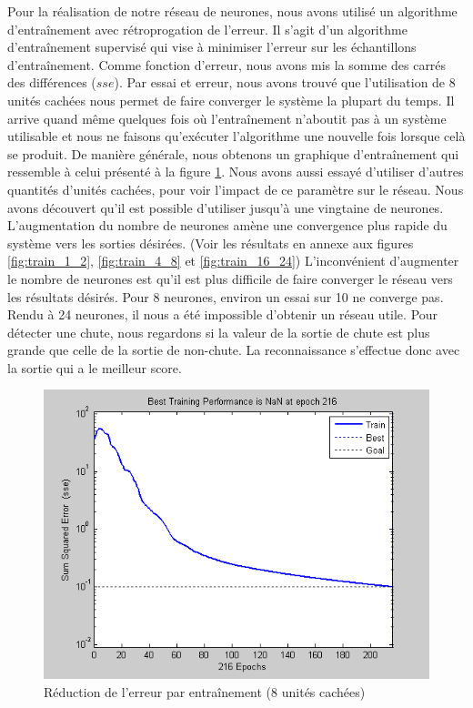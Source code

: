 \documentclass[12pt,letterpaper]{article}
\begin{document}
Pour la réalisation de notre réseau de neurones, nous avons utilisé un algorithme d'entraînement avec rétroprogation de l'erreur. Il s'agit d'un algorithme d'entraînement supervisé qui vise à minimiser l'erreur sur les échantillons d'entraînement. Comme fonction d'erreur, nous avons mis la somme des carrés des différences ($sse$). Par essai et erreur, nous avons trouvé que l'utilisation de 8 unités cachées nous permet de faire converger le système la plupart du temps. Il arrive quand même quelques fois où l'entraînement n'aboutit pas à un système utilisable et nous ne faisons qu'exécuter l'algorithme une nouvelle fois lorsque celà se produit. De manière générale, nous obtenons un graphique d'entraînement qui ressemble à celui présenté à la figure \ref{fig:training_8units}. Nous avons aussi essayé d'utiliser d'autres quantités d'unités cachées, pour voir l'impact de ce paramètre sur le réseau. Nous avons découvert qu'il est possible d'utiliser jusqu'à une vingtaine de neurones. L'augmentation du nombre de neurones amène une convergence plus rapide du système vers les sorties désirées. (Voir les résultats en annexe aux figures \ref{fig:train_1_2}, \ref{fig:train_4_8} et \ref{fig:train_16_24}) L'inconvénient d'augmenter le nombre de neurones est qu'il est plus difficile de faire converger le réseau vers les résultats désirés. Pour 8 neurones, environ un essai sur 10 ne converge pas. Rendu à 24 neurones, il nous a été impossible d'obtenir un réseau utile. Pour détecter une chute, nous regardons si la valeur de la sortie de chute est plus grande que celle de la sortie de non-chute. La reconnaissance s'effectue donc avec la sortie qui a le meilleur score.

\begin{figure}
    \centering
    \includegraphics[scale=0.6]{image/training_8units.png}
    \caption{Réduction de l'erreur par entraînement (8 unités cachées)}
    \label{fig:training_8units}
\end{figure}
\end{document}
